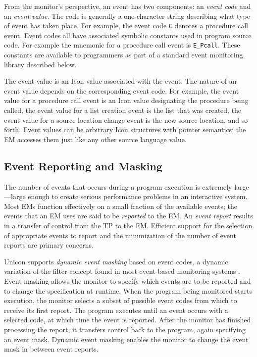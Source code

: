From the monitor's perspective, an event has two components: an
{\em event code\/} and an {\em event value\/}.  The code is
generally a one-character string describing what type of event
has taken place.  For example, the event code {\tt C} denotes a
procedure call event.  Event codes all have associated symbolic
constants used in program source code.  For example the mnemonic for a
procedure call event is {\tt E\_Pcall}.  These constants are available
to programmers as part of a standard event monitoring library
described below.

The event value is an Icon value associated with the event.  The
nature of an event value depends on the corresponding event code.
For example, the event value for a procedure call event is an
Icon value designating the procedure being called, the event value for
a list creation event is the list that was created, the event value
for a source location change event is the new source location, and so
forth.  Event values can be arbitrary Icon structures with pointer
semantics; the EM accesses them just like any other source language
value.

\subsection*{Event Reporting and Masking}

The number of events that occurs during a program execution is
extremely large---large enough to create serious performance problems
in an interactive system.  Most EMs function effectively on a
small fraction of the available events; the events that an EM uses
are said to be {\em reported\/} to the EM.  An {\em event report\/}
results in a transfer of control from the TP to the EM.  Efficient
support for the selection of appropriate events to report and the
minimization of the number of event reports are primary concerns.

Unicon supports {\em dynamic event masking\/} based on event codes,
a dynamic variation of the filter concept found in most event-based
monitoring systems
\cite{Bates89} \cite{Elshoff89}.
Event masking allows the monitor to specify which
events are to be reported and to change the specification at runtime.
When the program being monitored starts execution, the monitor selects
a subset of possible event codes from which to receive its first
report.  The program executes until an event occurs with a selected
code, at which time the event is reported.  After the monitor has
finished processing the report, it transfers control back to the
program, again specifying an event mask.  Dynamic event masking
enables the monitor to change the event mask in between event reports.

